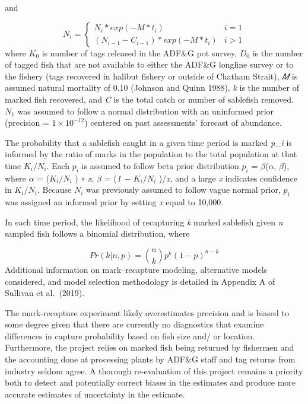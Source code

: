 \documentclass[
]{article}
\begin{document}
and

\[
\begin{equation}
N_{i} = \left\{ \begin{array}{ll}
N_i *exp(-M*t_i) &i = 1\\
(N_{i-1} - C_{i-1})*exp(-M*t_i) & i > 1
\end{array}\right.
\label{eq:mr2}
\end{equation}
\]
where \(K_0\) is number of tags released in the ADF\&G pot survey, \(D_0\) is the number of tagged fish that are not available to either the ADF\&G longline survey or to the fishery (tags recovered in halibut fishery or outside of Chatham Strait), \emph{𝑀} is assumed natural mortality of 0.10 (Johnson and Quinn 1988), \emph{k} is the number of marked fish recovered, and \emph{C} is the total catch or number of sablefish removed. \(N_1\) was assumed to follow a normal distribution with an uninformed prior (precision = \(1×10^{-12}\)) centered on past assessments' forecast of abundance.

The probability that a sablefish caught in a given time period is marked \emph{p\_i} is informed by the ratio of marks in the population to the total population at that time \(K_i/N_i\). Each \(p_i\) is assumed to follow beta prior distribution \(p_i\) = \(\beta\)(\(\alpha\), \(\beta\)), where \(\alpha\) = (\(K_i/N_i\) ) ∗ \emph{x}, \(\beta\) = (\emph{1 − \(K_i/N_i\) })/\emph{x}, and a large \emph{x} indicates confidence in \(K_i/N_i\). Because \(N_i\) was previously assumed to follow vague normal prior, \(p_i\) was assigned an informed prior by setting \emph{x} equal to 10,000.

In each time period, the likelihood of recapturing \emph{k} marked sablefish given \emph{n} sampled fish follows a binomial distribution, where

\[
\begin{equation}
Pr(k|n,p) = {n \choose k}p^k(1-p)^{n-k}
\label{eq:mr3}
\end{equation}
\]
Additional information on mark--recapture modeling, alternative models considered, and model selection methodology is detailed in Appendix A of Sullivan et al.~(2019).

The mark-recapture experiment likely overestimates precision and is biased to some degree given that there are currently no diagnostics that examine differences in capture probability based on fish size and/ or location. Furthermore, the project relies on marked fish being returned by fishermen and the accounting done at processing plants by ADF\&G staff and tag returns from industry seldom agree. A thorough re-evaluation of this project remains a priority both to detect and potentially correct biases in the estimates and produce more accurate estimates of uncertainty in the estimate.
\end{document}
